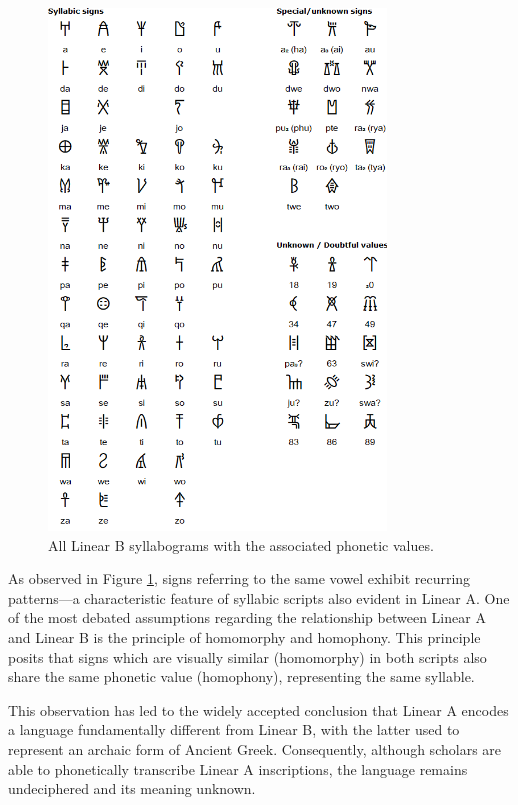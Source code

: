 \begin{figure}[H]
\centering
\includegraphics[width=0.8\textwidth]{Images/syll_LB.png}
\caption{All Linear B syllabograms with the associated phonetic values.}
\label{fig:syll_LB}
\end{figure}

As observed in Figure \ref{fig:syll_LB}, signs referring to the same vowel exhibit recurring patterns—a characteristic feature of syllabic scripts also evident in Linear A.
One of the most debated assumptions regarding the relationship between Linear A and Linear B is the principle of homomorphy and homophony.
This principle posits that signs which are visually similar (homomorphy) in both scripts also share the same phonetic value (homophony), representing the same syllable. \cite{salg-ch1}

This observation has led to the widely accepted conclusion that Linear A encodes a language fundamentally different from Linear B, with the latter used to represent an archaic form of Ancient Greek.
Consequently, although scholars are able to phonetically transcribe Linear A inscriptions, the language remains undeciphered and its meaning unknown. 

